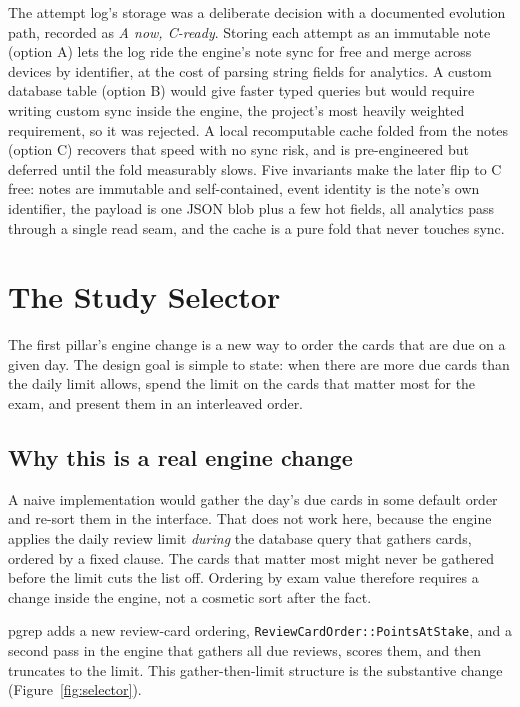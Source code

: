 \documentclass[11pt]{article}
\begin{document}
The attempt log's storage was a deliberate decision with a documented evolution path,
recorded as \emph{A now, C-ready}. Storing each attempt as an immutable note (option
A) lets the log ride the engine's note sync for free and merge across devices by
identifier, at the cost of parsing string fields for analytics. A custom database
table (option B) would give faster typed queries but would require writing custom sync
inside the engine, the project's most heavily weighted requirement, so it was rejected.
A local recomputable cache folded from the notes (option C) recovers that speed with no
sync risk, and is pre-engineered but deferred until the fold measurably slows. Five
invariants make the later flip to C free: notes are immutable and self-contained, event
identity is the note's own identifier, the payload is one JSON blob plus a few hot
fields, all analytics pass through a single read seam, and the cache is a pure fold that
never touches sync.

\section{The Study Selector}

The first pillar's engine change is a new way to order the cards that are due on a
given day. The design goal is simple to state: when there are more due cards than the
daily limit allows, spend the limit on the cards that matter most for the exam, and
present them in an interleaved order.

\subsection{Why this is a real engine change}

A naive implementation would gather the day's due cards in some default order and
re-sort them in the interface. That does not work here, because the engine applies
the daily review limit \emph{during} the database query that gathers cards, ordered
by a fixed clause. The cards that matter most might never be gathered before the
limit cuts the list off. Ordering by exam value therefore requires a change inside
the engine, not a cosmetic sort after the fact.

pgrep adds a new review-card ordering, \texttt{ReviewCardOrder::PointsAtStake}, and a
second pass in the engine that gathers all due reviews, scores them, and then
truncates to the limit. This gather-then-limit structure is the substantive change
(Figure~\ref{fig:selector}).
\end{document}
